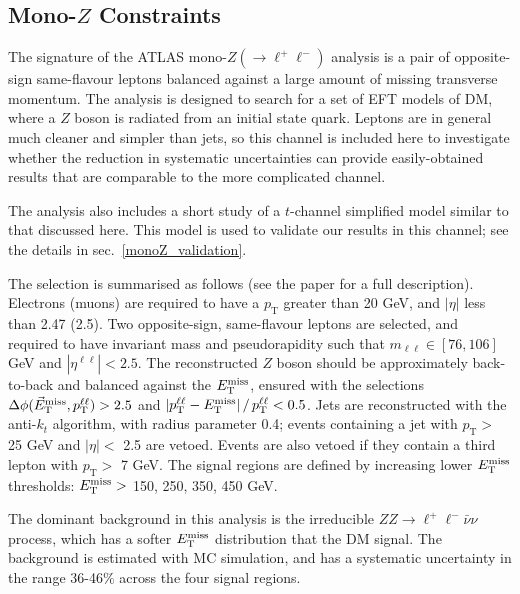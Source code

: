 \subsection{Mono-$Z$ Constraints}
\label{monoZ_constraints}
The signature of the ATLAS mono-$Z(\rightarrow \ell^+ \ell^-)$ analysis \cite{Aad:2014monoZlep} is a pair of opposite-sign same-flavour leptons balanced against a large amount of missing transverse momentum. The analysis is designed to search for a set of EFT models of DM, where a $Z$ boson is radiated from an initial state quark. Leptons are in general much cleaner and simpler than jets, so this channel is included here to investigate whether the reduction in systematic uncertainties can provide easily-obtained results that are comparable to the more complicated \monojet channel.

The analysis also includes a short study of a $t$-channel simplified model similar to that discussed here. This model is used to validate our results in this channel; see the details in sec.~\ref{monoZ_validation}.

The selection is summarised as follows (see the paper for a full description). Electrons (muons) are required to have a $p_{\mathrm{T}}$ greater than 20 GeV, and $|\eta|$ less than 2.47 (2.5). Two opposite-sign, same-flavour leptons are selected, and required to have invariant mass and pseudorapidity such that $m_{\ell \ell} \in [76, 106]$ GeV and $|\eta^{\ell \ell}| < 2.5$. The reconstructed $Z$ boson should be approximately back-to-back and balanced against the $E_{\mathrm{T}}^{\mathrm{miss}}$, ensured with the selections $\Delta \phi (\vec{E}_{\mathrm{T}}^{\mathrm{miss}}, p_{\mathrm{T}}^{\ell \ell}) > 2.5$ and $| p_{\mathrm{T}}^{\ell \ell} - E_{\mathrm{T}}^{\mathrm{miss}} | \, /  \, p_{\mathrm{T}}^{\ell \ell} < 0.5$. Jets are reconstructed with the anti-$k_t$ algorithm, with radius parameter 0.4; events containing a jet with $p_{\mathrm{T}}>$ 25 GeV and $|\eta|< $ 2.5 are vetoed. Events are also vetoed if they contain a third lepton with $p_{\mathrm{T}}>$ 7 GeV. The signal regions are defined by increasing lower $E_{\mathrm{T}}^{\mathrm{miss}}$ thresholds: $E_{\mathrm{T}}^{\mathrm{miss}} >$ 150, 250, 350, 450 GeV.


The dominant background in this analysis is the irreducible $ZZ \rightarrow \ell^+ \ell^- \bar{\nu} \nu$ process, which has a softer $E_{\mathrm{T}}^{\mathrm{miss}}$ distribution that the DM signal. The background is estimated with MC simulation, and has a systematic uncertainty in the range 36-46$\%$ across the four signal regions.

